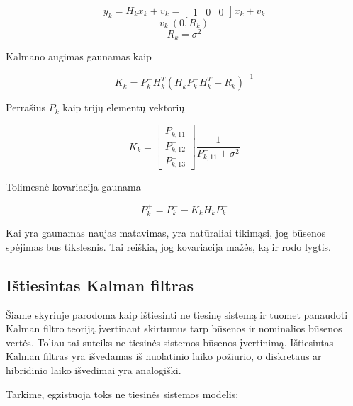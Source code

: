    \begin{equation}
        y_k = H_kx_k + v_k = \begin{bmatrix} 1 & 0 & 0 \end{bmatrix} x_k + v_k
    \end{equation}
    \begin{equation}
        v_k ~ (0, R_k)
    \end{equation}
    \begin{equation}
        R_k = \sigma^2
    \end{equation}

    Kalmano augimas gaunamas kaip

    \begin{equation}
        K_k = P_k^-H_k^T(H_kP_k^-H_k^T+R_k)^{-1}
    \end{equation}

    Perrašius $P_k$ kaip trijų elementų vektorių

    \begin{equation}
        K_k = \begin{bmatrix} P_{k,11}^- \\ P_{k,12}^- \\ P_{k,13}^- \end{bmatrix} \frac{1}{P_{k,11}^- + \sigma^2}
    \end{equation}

    Tolimesnė kovariacija gaunama

    \begin{equation}
        P_k^+ = P_k^- - K_kH_kP_k^-
    \end{equation}

    Kai yra gaunamas naujas matavimas, yra natūraliai tikimąsi, jog būsenos spėjimas bus tikslesnis.
    Tai reiškia, jog kovariacija mažės, ką ir rodo lygtis.

    \subsection{Ištiesintas Kalman filtras}

    Šiame skyriuje parodoma kaip ištiesinti ne tiesinę sistemą ir tuomet panaudoti Kalman filtro teoriją įvertinant skirtumus tarp būsenos ir nominalios būsenos vertės.
    Toliau tai suteiks ne tiesinės sistemos būsenos įvertinimą.
    Ištiesintas Kalman filtras yra išvedamas iš nuolatinio laiko požiūrio, o diskretaus ar hibridinio laiko išvedimai yra analogiški.

    Tarkime, egzistuoja toks ne tiesinės sistemos modelis:


